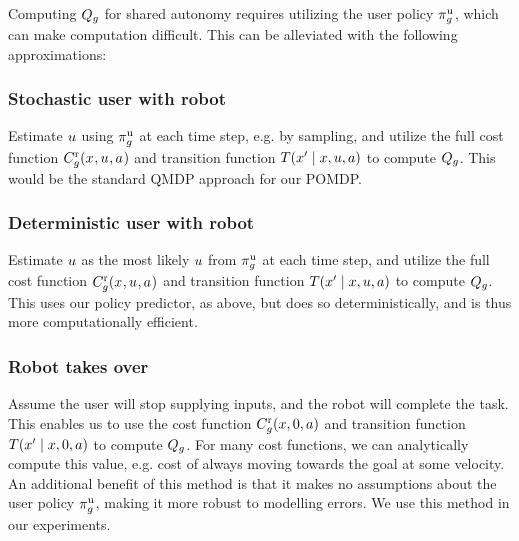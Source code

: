 
Computing $Q_{g}$ for shared autonomy requires utilizing the user policy $\pi^{\text{u}}_g$, which can make computation difficult. This can be alleviated with the following approximations:
\subsubsection*{Stochastic user with robot}
Estimate $u$ using $\pi^{\text{u}}_g$ at each time step, e.g. by sampling, and utilize the full cost function $C^{\text{r}}_g(x_{ }, u_{ }, a_{ })$ and transition function $T(x' \mid x, u, a)$ to compute $Q_{g}$. This would be the standard QMDP approach for our POMDP.

\subsubsection*{Deterministic user with robot}
Estimate $u$ as the most likely $u$ from $\pi^{\text{u}}_g$ at each time step, and utilize the full cost function $C^{\text{r}}_g(x_{ }, u_{ }, a_{ })$ and transition function $T(x' \mid x, u, a)$ to compute $Q_{g}$. This uses our policy predictor, as above, but does so deterministically, and is thus more computationally efficient.

\subsubsection*{Robot takes over}
Assume the user will stop supplying inputs, and the robot will complete the task. This enables us to use the cost function $C^{\text{r}}_g(x, 0, a)$ and transition function $T(x' \mid x, 0, a)$ to compute $Q_{g}$. For many cost functions, we can analytically compute this value, e.g. cost of always moving towards the goal at some velocity. An additional benefit of this method is that it makes no assumptions about the user policy $\pi^{\text{u}}_g$, making it more robust to modelling errors. We use this method in our experiments.

